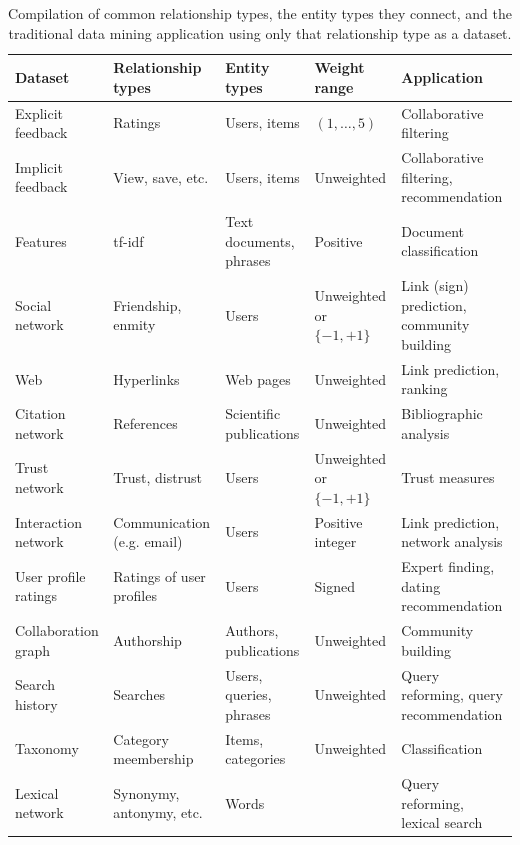 \documentclass{article}
\begin{document}
\begin{table}
  \centering
  \small
  \caption{
    Compilation of common relationship types, the entity types they
    connect, and the traditional data mining application using only that
    relationship type as a dataset. 
  }
  \begin{tabular}{|p{}|p{}|p{}|p{}|p{}|}
    \hline
    \textbf{Dataset} & \textbf{Relationship types} & \textbf{Entity types} & \textbf{Weight range} &
    \textbf{Application} \\
    \hline
    \hline
    Explicit feedback & Ratings & Users, items & $(1,\ldots,5)$ &
    Collaborative filtering \\
    \hline
    Implicit feedback & View, save, etc.  &
    Users, items & Unweighted & Collaborative filtering, recommendation
    \\
    \hline
    Features & tf-idf & Text documents, phrases & Positive & Document
    classification \\
    \hline
    Social network & Friendship, enmity & Users & Unweighted or
    $\{-1,+1\}$ & Link (sign) prediction, community building \\
    \hline
    Web & Hyperlinks & Web pages & Unweighted & Link prediction, ranking
    \\
    \hline
    Citation network & References & Scientific publications & Unweighted
    & Bibliographic analysis \\
    \hline
    Trust network & Trust, distrust & Users & Unweighted or $\{-1,+1\}$
    & Trust measures \\
    \hline
    Interaction network & Communication (e.g. email) & Users & Positive integer & Link
    prediction, network analysis \\
    \hline
    User profile ratings & Ratings of user profiles & Users & Signed &
    Expert finding, dating recommendation \\
    \hline
    Collaboration graph & Authorship & Authors, publications & Unweighted & Community
    building \\
    \hline
    Search history & Searches & Users, queries, phrases & Unweighted & Query
    reforming, query recommendation \\
    \hline
    Taxonomy & Category meembership & Items, categories & Unweighted & Classification
    \\
    \hline
    Lexical network & Synonymy, antonymy, etc. & Words & & Query
    reforming, lexical search \\
    \hline
  \end{tabular}
  \label{tab:examples}
\end{table}
\end{document}
